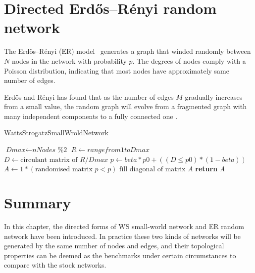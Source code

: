 \section{Directed Erdős–Rényi random network}
The Erdös–Rényi (ER) model~\cite{random} generates a graph that winded randomly between $N$ nodes in the network with probability $p$. The degrees of nodes comply with a Poisson distribution, indicating that most nodes have approximately same number of edges.

Erdős and Rényi has found that as the number of edges $M$ gradually increases from a small value, the random graph will evolve from a fragmented graph with many independent components to a fully connected one \cite{strogatz2001exploring}.

\begin{algorithm}[H]
	\caption{WattsStrogatzSmallWroldNetwork}\label{alg:random}
	\begin{algorithmic}[1]
		\State $\textit{Dmax} \gets \textit{nNodes \% 2}$
		\State $\textit{R} \gets range from 1 to \textit{Dmax}$
		\State $\textit{D} \gets \text{circulant matrix of } \textit{R}/\textit{Dmax}$
		\State $\textit{p} \gets \textit{beta}*\textit{p0}+((\textit{D} \leq \textit{p0})*(1-\textit{beta}))$
		\State $\textit{A} \gets 1*(\text{randomised matrix }\textit{p} < p)$
		\State $\text{fill diagonal of matrix }\textit{A}$
		\State \textbf{return} {\textit{A}}
		\EndProcedure
	\end{algorithmic}
\end{algorithm}

\section{Summary}
In this chapter, the directed forms of WS small-world network and ER random network have been introduced. In practice these two kinds of networks will be generated by the same number of nodes and edges, and their topological properties can be deemed as the benchmarks under certain circumstances to compare with the stock networks.